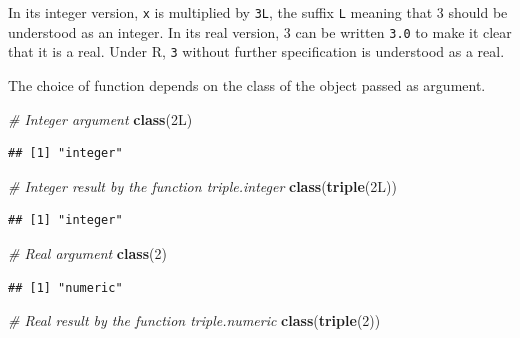 \documentclass[
  12pt,
  american,
  a4paper,
  extrafontsizes,onecolumn,openright
  ]{memoir}
\newenvironment{Shaded}{\begin{snugshade}}{\end{snugshade}}
\newcommand{\CommentTok}[1]{\textcolor[rgb]{0.56,0.35,0.01}{\textit{#1}}}
\newcommand{\DataTypeTok}[1]{\textcolor[rgb]{0.13,0.29,0.53}{#1}}
\newcommand{\DecValTok}[1]{\textcolor[rgb]{0.00,0.00,0.81}{#1}}
\newcommand{\FunctionTok}[1]{\textcolor[rgb]{0.13,0.29,0.53}{\textbf{#1}}}
\newcommand{\NormalTok}[1]{#1}
\begin{document}
\normalsize

In its integer version, \texttt{x} is multiplied by \texttt{3L}, the suffix \texttt{L} meaning that 3 should be understood as an integer.
In its real version, 3 can be written \texttt{3.0} to make it clear that it is a real.
Under R, \texttt{3} without further specification is understood as a real.

The choice of function depends on the class of the object passed as argument.

\scriptsize

\begin{Shaded}
\begin{Highlighting}[]
\CommentTok{\# Integer argument}
\FunctionTok{class}\NormalTok{(}\DecValTok{2}\DataTypeTok{L}\NormalTok{)}
\end{Highlighting}
\end{Shaded}

\begin{verbatim}
## [1] "integer"
\end{verbatim}

\begin{Shaded}
\begin{Highlighting}[]
\CommentTok{\# Integer result by the function triple.integer}
\FunctionTok{class}\NormalTok{(}\FunctionTok{triple}\NormalTok{(}\DecValTok{2}\DataTypeTok{L}\NormalTok{))}
\end{Highlighting}
\end{Shaded}

\begin{verbatim}
## [1] "integer"
\end{verbatim}

\begin{Shaded}
\begin{Highlighting}[]
\CommentTok{\# Real argument}
\FunctionTok{class}\NormalTok{(}\DecValTok{2}\NormalTok{)}
\end{Highlighting}
\end{Shaded}

\begin{verbatim}
## [1] "numeric"
\end{verbatim}

\begin{Shaded}
\begin{Highlighting}[]
\CommentTok{\# Real result by the function triple.numeric}
\FunctionTok{class}\NormalTok{(}\FunctionTok{triple}\NormalTok{(}\DecValTok{2}\NormalTok{))}
\end{Highlighting}
\end{Shaded}
\end{document}
